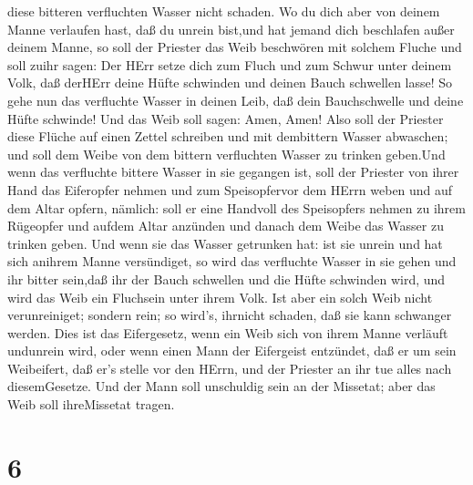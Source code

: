 diese bitteren verfluchten Wasser nicht schaden.  Wo du
dich aber von deinem Manne verlaufen hast, daß du unrein bist,und hat
jemand dich beschlafen außer deinem Manne,  so soll der
Priester das Weib beschwören mit solchem Fluche und soll zuihr sagen:
Der HErr setze dich zum Fluch und zum Schwur unter deinem Volk, daß
derHErr deine Hüfte schwinden und deinen Bauch schwellen lasse!
 So gehe nun das verfluchte Wasser in deinen Leib, daß dein
Bauchschwelle und deine Hüfte schwinde! Und das Weib soll sagen: Amen,
Amen!  Also soll der Priester diese Flüche auf einen Zettel
schreiben und mit dembittern Wasser abwaschen;  und soll
dem Weibe von dem bittern verfluchten Wasser zu trinken geben.Und wenn
das verfluchte bittere Wasser in sie gegangen ist,  soll
der Priester von ihrer Hand das Eiferopfer nehmen und zum Speisopfervor
dem HErrn weben und auf dem Altar opfern, nämlich:  soll er
eine Handvoll des Speisopfers nehmen zu ihrem Rügeopfer und aufdem Altar
anzünden und danach dem Weibe das Wasser zu trinken geben. 
Und wenn sie das Wasser getrunken hat: ist sie unrein und hat sich
anihrem Manne versündiget, so wird das verfluchte Wasser in sie gehen
und ihr bitter sein,daß ihr der Bauch schwellen und die Hüfte schwinden
wird, und wird das Weib ein Fluchsein unter ihrem Volk. 
Ist aber ein solch Weib nicht verunreiniget; sondern rein; so wird's,
ihrnicht schaden, daß sie kann schwanger werden.  Dies ist
das Eifergesetz, wenn ein Weib sich von ihrem Manne verläuft undunrein
wird,  oder wenn einen Mann der Eifergeist entzündet, daß
er um sein Weibeifert, daß er's stelle vor den HErrn, und der Priester
an ihr tue alles nach diesemGesetze.  Und der Mann soll
unschuldig sein an der Missetat; aber das Weib soll ihreMissetat tragen.

\hypertarget{section-5}{%
\section{6}\label{section-5}}

